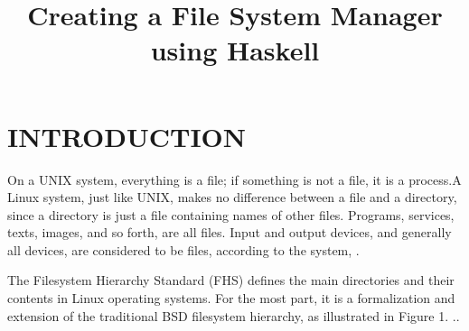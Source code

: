 \documentclass{aes2e}
\begin{document}


\title{Creating a File System Manager using Haskell}




\maketitle

\section{INTRODUCTION}

On a UNIX system, everything is a file; if something is not a file, it is a process.A Linux system, just like UNIX, makes no difference between a file and a directory, since a directory is just a file containing names of other files. Programs, services, texts, images, and so forth, are all files. Input and output devices, and generally all devices, are considered to be files, according to the system, \cite{DEK1}. \newline

The Filesystem Hierarchy Standard (FHS) defines the main directories and their contents in Linux operating systems. For the most part, it is a formalization and extension of the traditional BSD filesystem hierarchy, as illustrated in  Figure 1. \cite{DEK2}.\newline.
\end{document}
